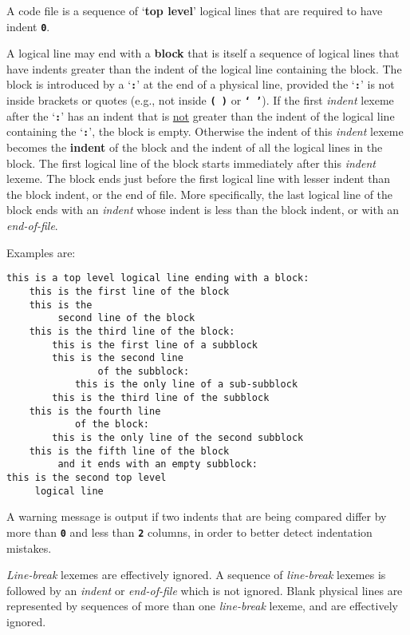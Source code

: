 \documentclass[12pt]{article}
\newcommand{\TT}[1]{{\tt \bfseries #1}}
\newcommand{\key}[1]{{\rm \bfseries #1}}
\newenvironment{indpar}[1][0.3in]%
	{\begin{list}{}%
		     {\setlength{\itemsep}{0in}%
		      \setlength{\topsep}{0in}%
		      \setlength{\parsep}{1ex}%
		      \setlength{\labelwidth}{#1}%
		      \setlength{\leftmargin}{#1}%
		      \addtolength{\leftmargin}{\labelsep}}%
	 \item}%
	{\end{list}}
\begin{document}
A code file is a sequence of `\key{top level}' logical lines that
are required to have indent \TT{0}.

A logical line may end with a \key{block} that is itself a sequence of
logical lines that have indents greater than the indent of the
logical line containing the block.
The block is introduced by a `\TT{:}' at the end
of a physical line, provided the `\TT{:}' is not inside brackets
or quotes
(e.g., not inside \TT{(~)} or \TT{`~'}).
If the first {\em indent} lexeme after the
`\TT{:}' has an indent that is \underline{not} greater than the indent
of the logical line containing the `\TT{:}', the block is empty.
Otherwise the indent of this {\em indent} lexeme becomes the
\key{indent} of the block and the indent of all the
logical lines in the block.  The first logical line of the block
starts immediately after this {\em indent} lexeme.
The block ends just before the first
logical line with lesser indent than the block indent, or the end of file.
More specifically, the last logical line of the block ends with an
{\em indent} whose indent is less than the block indent, or with an
{\em end-of-file}.

Examples are:
\begin{indpar}\begin{verbatim}
this is a top level logical line ending with a block:
    this is the first line of the block
    this is the
         second line of the block
    this is the third line of the block:
        this is the first line of a subblock
        this is the second line
                of the subblock:
            this is the only line of a sub-subblock
        this is the third line of the subblock
    this is the fourth line
            of the block:
        this is the only line of the second subblock
    this is the fifth line of the block
         and it ends with an empty subblock:
this is the second top level
     logical line
\end{verbatim}\end{indpar}

A warning message is output if two indents that are being compared
differ by more than \TT{0} and
less than \TT{2} columns, in order to better detect
indentation mistakes.

{\em Line-break} lexemes are effectively ignored.  A sequence
of {\em line-break} lexemes is followed by an {\em indent}
or {\em end-of-file} which is not ignored.
Blank physical lines are represented by sequences of
more than one {\em line-break} lexeme, and are effectively
ignored.
\end{document}
